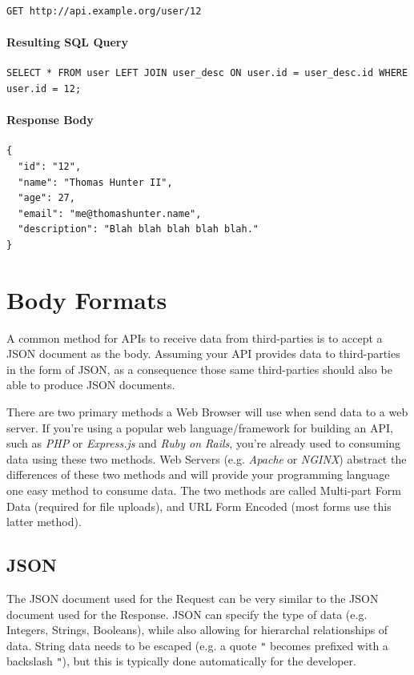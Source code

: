 \begin{verbatim}
GET http://api.example.org/user/12
\end{verbatim}

\paragraph{\textbf{Resulting SQL Query}}

\begin{verbatim}
SELECT * FROM user LEFT JOIN user_desc ON user.id = user_desc.id WHERE user.id = 12;
\end{verbatim}

\paragraph{\textbf{Response Body}}

\begin{verbatim}
{
  "id": "12",
  "name": "Thomas Hunter II",
  "age": 27,
  "email": "me@thomashunter.name",
  "description": "Blah blah blah blah blah."
}
\end{verbatim}


\section{Body Formats}

A common method for APIs to receive data from third-parties is to accept a JSON document as the body. Assuming your API provides data to third-parties in the form of JSON, as a consequence those same third-parties should also be able to produce JSON documents.

There are two primary methods a Web Browser will use when send data to a web server. If you're using a popular web language/framework for building an API, such as \emph{PHP} or \emph{Express.js} and \emph{Ruby on Rails}, you're already used to consuming data using these two methods. Web Servers (e.g. \emph{Apache} or \emph{NGINX}) abstract the differences of these two methods and will provide your programming language one easy method to consume data. The two methods are called Multi-part Form Data (required for file uploads), and URL Form Encoded (most forms use this latter method).

\subsection{JSON}

The JSON document used for the Request can be very similar to the JSON document used for the Response. JSON can specify the type of data (e.g. Integers, Strings, Booleans), while also allowing for hierarchal relationships of data. String data needs to be escaped (e.g. a quote \texttt{"} becomes prefixed with a backslash \texttt{"}), but this is typically done automatically for the developer.

